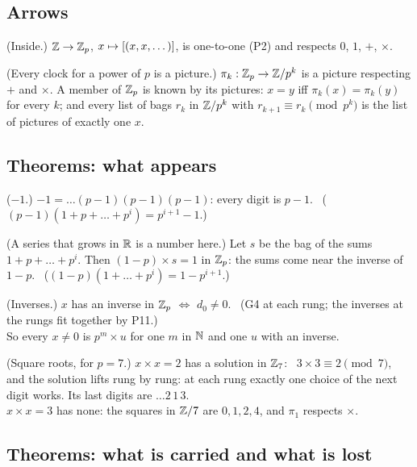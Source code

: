 \subsection*{Arrows}

\begin{lines}
\item[\lab{P10}] (Inside.) $\mathbb{Z} \to \mathbb{Z}_p$, $x \mapsto [(x, x, \dots)]$, is one-to-one (P2) and respects $0$, $1$, $+$, $\times$.
\item[\lab{P11}] (Every clock for a power of $p$ is a picture.) $\pi_k : \mathbb{Z}_p \to \mathbb{Z}/p^k$ is a picture respecting $+$ and $\times$. A member of $\mathbb{Z}_p$ is known by its pictures: $x = y$ iff $\pi_k(x) = \pi_k(y)$ for every $k$; and every list of bags $r_k$ in $\mathbb{Z}/p^k$ with $r_{k+1} \equiv r_k \pmod{p^k}$ is the list of pictures of exactly one $x$.
\end{lines}

\subsection*{Theorems: what appears}

\begin{lines}
\item[\lab{T1}] ($-1$.) $-1 = \dots (p{-}1)(p{-}1)(p{-}1)$: every digit is $p - 1$. \ ($(p - 1)(1 + p + \dots + p^{i}) = p^{i+1} - 1$.)
\item[\lab{T2}] (A series that grows in $\mathbb{R}$ is a number here.) Let $s$ be the bag of the sums $1 + p + \dots + p^i$. Then $(1 - p) \times s = 1$ in $\mathbb{Z}_p$: the sums come near the inverse of $1 - p$. \ ($(1 - p)(1 + \dots + p^i) = 1 - p^{i+1}$.)
\item[\lab{T3}] (Inverses.) $x$ has an inverse in $\mathbb{Z}_p$ $\iff$ $d_0 \neq 0$. \ (G4 at each rung; the inverses at the rungs fit together by P11.) \\
So every $x \neq 0$ is $p^m \times u$ for one $m$ in $\mathbb{N}$ and one $u$ with an inverse.
\item[\lab{T4}] (Square roots, for $p = 7$.) $x \times x = 2$ has a solution in $\mathbb{Z}_7$: \ $3 \times 3 \equiv 2 \pmod 7$, and the solution lifts rung by rung: at each rung exactly one choice of the next digit works. Its last digits are $\dots 2\,1\,3$. \\
$x \times x = 3$ has none: the squares in $\mathbb{Z}/7$ are $0, 1, 2, 4$, and $\pi_1$ respects $\times$.
\end{lines}

\subsection*{Theorems: what is carried and what is lost}

